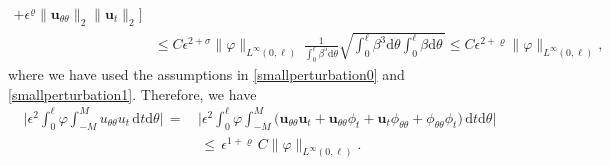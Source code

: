\documentclass[10pt, reqno]{amsart}
\numberwithin{equation}{section}
\theoremstyle{definition}
\begin{document}
{{\begin{align*}
 +\epsilon^\varrho\|{\mathbf u}_{\theta\theta}\|_2\|{\mathbf u}_t\|_2\Big]
\nonumber\\[2mm]
 &\leq
 C\epsilon^{2+\sigma}\|\varphi\|_{L^\infty(0,\ell)}\, \frac{1}{\displaystyle\int_0^{\ell}\beta^5 {\mathrm d}\theta}
 \sqrt{\int_0^{\ell} \beta^3 {\mathrm d}\theta \int_0^{\ell}\beta {\mathrm d}\theta\,}\leq
 C\epsilon^{2+\varrho}\|\varphi\|_{L^\infty(0,\ell)},
\end{align*}
where we have used the assumptions in \eqref{smallperturbation0} and \eqref{smallperturbation1}.
Therefore, we have
\begin{align}\label{inedtitiesterm3}
\Bigg| \epsilon^2\int_0^\ell \varphi \int_{-M}^{M}
 u_{\theta\theta} u_t\,{\mathrm d}t{\mathrm d}\theta\Bigg|
 \,=\,&
\Bigg| \epsilon^2\int_0^\ell \varphi \int_{-M}^{M}
 \big({\mathbf u}_{\theta\theta}{\mathbf u}_t+{\mathbf u}_{\theta\theta}\phi_t+{\mathbf u}_t\phi_{\theta\theta}+\phi_{\theta\theta}\phi_t\big)
 \,{\mathrm d}t{\mathrm d}\theta\Bigg|
  \nonumber\\[2mm]
  &\,\leq\, \epsilon^{1+\varrho}\,C \|\varphi\|_{L^\infty(0,\ell)}.
\end{align}




}}
\end{document}
